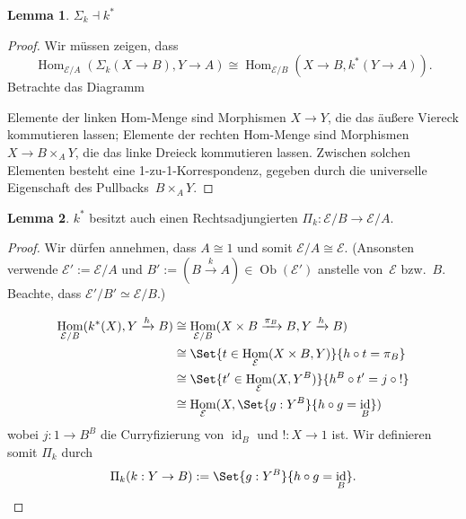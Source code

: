 \documentclass{article}
\theoremstyle{definition}
\newtheorem*{lem}{Lemma}
\theoremstyle{remark}
\newcommand{\coloneqq}{:=} %
\DeclareMathOperator{\Ob}{Ob} %
\DeclareMathOperator{\Hom}{Hom} %
\DeclareMathOperator{\id}{id} %
\newcommand{\ladj}{\dashv} %
\newcommand{\Eat}{\mathcal{E}} %
\begin{document}
\begin{lem}
  $\Sigma_k \ladj k^*$
\end{lem}

\begin{proof}
Wir müssen zeigen, dass
\[
  \Hom_{\Eat/A}(\Sigma_k(X \to B), Y \to A) \cong \Hom_{\Eat/B}(X \to B, k^*(Y \to A)).
\]
Betrachte das Diagramm

\begin{center}\end{center}

Elemente der linken Hom-Menge sind Morphismen $X \to Y$, die das äußere Viereck kommutieren lassen; Elemente der rechten Hom-Menge sind Morphismen $X \to B \times_A Y$, die das linke Dreieck kommutieren lassen.
Zwischen solchen Elementen besteht eine 1-zu-1-Korrespondenz, gegeben durch die universelle Eigenschaft des Pullbacks~$B \times_A Y$.
\end{proof}

\begin{lem}
  $k^*$ besitzt auch einen Rechtsadjungierten $\Pi_k : \Eat/B \to \Eat/A$.
\end{lem}

\begin{proof}
  Wir dürfen annehmen, dass $A \cong 1$ und somit $\Eat/A \cong \Eat$. (Ansonsten verwende $\Eat' \coloneqq \Eat/A$ und $B' \coloneqq (B \xrightarrow{k} A) \in \Ob(\Eat')$ anstelle von~$\Eat$ bzw.~$B$. Beachte, dass $\Eat'/B' \simeq \Eat/B$.)

  \begin{align*}
    \Hom_{\Eat/B}(k^*(X), Y \xrightarrow{h} B)
    & \cong \Hom_{\Eat/B}(X \times B \xrightarrow{\pi_B} B, Y \xrightarrow{h} B) \\
    & \cong \Set{t \in \Hom_\Eat(X \times B, Y)}{h \circ t = \pi_B} \\
    & \cong \Set{t' \in \Hom_\Eat(X, Y^B)}{h^B \circ t' = j \circ {!}} \\
    & \cong \Hom_\Eat(X, \Set{g : Y^B}{h \circ g = \id_B})
  \end{align*}
  wobei $j : 1 \to B^B$ die Curryfizierung von $\id_B$ und $! : X \to 1$ ist.
  Wir definieren somit $\Pi_k$ durch
  \[
    \Pi_k(k : Y \to B) \coloneqq \Set{g : Y^B}{h \circ g = \id_B}.
    \qedhere
  \]
\end{proof}
\end{document}

